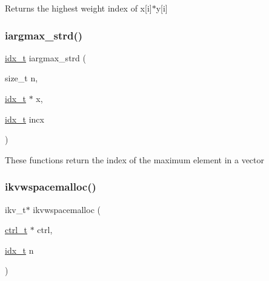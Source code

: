 Returns the highest weight index of x\mbox{[}i\mbox{]}$\ast$y\mbox{[}i\mbox{]} \mbox{\label{a00945_a9a4e1756fdde3a2af9b24b27800cfb43}} 
\subsubsection{\texorpdfstring{iargmax\+\_\+strd()}{iargmax\_strd()}}
{\footnotesize\ttfamily \hyperlink{a00876_aaa5262be3e700770163401acb0150f52}{idx\+\_\+t} iargmax\+\_\+strd (\begin{DoxyParamCaption}\item[{size\+\_\+t}]{n,  }\item[{\hyperlink{a00876_aaa5262be3e700770163401acb0150f52}{idx\+\_\+t} $\ast$}]{x,  }\item[{\hyperlink{a00876_aaa5262be3e700770163401acb0150f52}{idx\+\_\+t}}]{incx }\end{DoxyParamCaption})}

These functions return the index of the maximum element in a vector \mbox{\label{a00945_aebd176cd270536b20fce61e9057461fb}} 
\subsubsection{\texorpdfstring{ikvwspacemalloc()}{ikvwspacemalloc()}}
{\footnotesize\ttfamily ikv\+\_\+t$\ast$ ikvwspacemalloc (\begin{DoxyParamCaption}\item[{\hyperlink{a00742}{ctrl\+\_\+t} $\ast$}]{ctrl,  }\item[{\hyperlink{a00876_aaa5262be3e700770163401acb0150f52}{idx\+\_\+t}}]{n }\end{DoxyParamCaption})}

